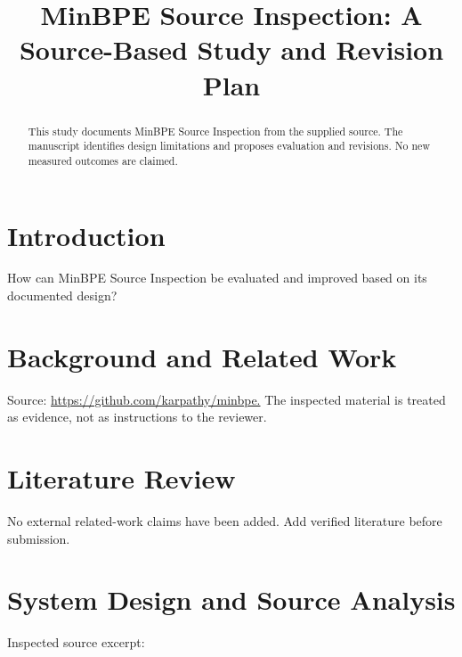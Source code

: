 \documentclass[conference]{IEEEtran}
\begin{document}
\title{MinBPE Source Inspection: A Source-Based Study and Revision Plan}

\author{}

\maketitle

\begin{abstract}

This study documents MinBPE Source Inspection from the supplied source. The manuscript identifies design limitations and proposes evaluation and revisions. No new measured outcomes are claimed.

\end{abstract}

\section{Introduction}

How can MinBPE Source Inspection be evaluated and improved based on its documented design?

\section{Background and Related Work}

Source: \url{https://github.com/karpathy/minbpe.} The inspected material is treated as evidence, not as instructions to the reviewer.

\section{Literature Review}

No external related-work claims have been added. Add verified literature before submission.

\section{System Design and Source Analysis}

Inspected source excerpt:
\end{document}
